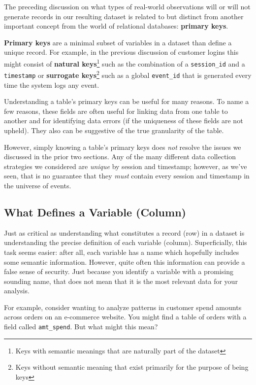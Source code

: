 \documentclass[
]{krantz}
\begin{document}
The preceding discussion on what types of real-world observations will or will not generate records in our resulting dataset is related to but distinct from another important concept from the world of relational databases: \textbf{primary keys}.

\textbf{Primary keys} are a minimal subset of variables in a dataset than define a unique record.
For example, in the previous discussion of customer logins this might consist of \textbf{natural keys}\footnote{Keys with semantic meanings that are naturally part of the dataset} such as the combination of a \texttt{session\_id} and a \texttt{timestamp} or \textbf{surrogate keys}\footnote{Keys without semantic meaning that exist primarily for the purpose of being keys} such as a global \texttt{event\_id} that is generated every time the system logs any event.

Understanding a table's primary keys can be useful for many reasons.
To name a few reasons, these fields are often useful for linking data from one table to another and for identifying data errors (if the uniqueness of these fields are not upheld).
They also can be suggestive of the true granularity of the table.

However, simply knowing a table's primary keys does \emph{not} resolve the issues we discussed in the prior two sections.
Any of the many different data collection strategies we considered are \emph{unique} by session and timestamp;
however, as we've seen, that is no guarantee that they \emph{must} contain every session and timestamp in the universe of events.

\hypertarget{what-defines-a-variable-column}{%
\subsection{What Defines a Variable (Column)}\label{what-defines-a-variable-column}}

Just as critical as understanding what constitutes a record (row) in a dataset is understanding the precise definition of each variable (column).
Superficially, this task seems easier: after all, each variable has a name which hopefully includes some semantic information. However, quite often this information can provide a false sense of security.
Just because you identify a variable with a promising sounding name, that does not mean that it is the most relevant data for your analysis.

For example, consider wanting to analyze patterns in customer spend amounts across orders on an e-commerce website.
You might find a table of orders with a field called \texttt{amt\_spend}. But what might this mean?
\end{document}
